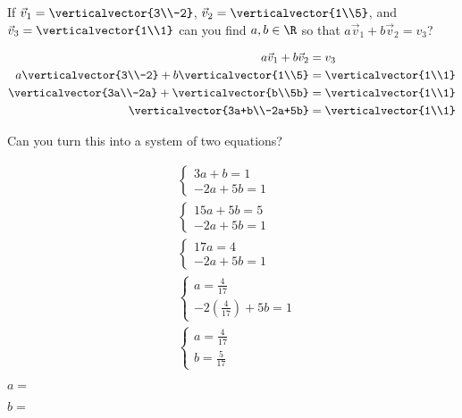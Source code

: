 \documentclass{ximera}
\begin{document}
\begin{question}
  
  If $\vec{v}_1 = \verticalvector{3\\-2} $, $\vec{v}_2 = \verticalvector{1\\5}$,  and  $\vec{v}_3 = \verticalvector{1\\1}$
  can you find $a,b \in \R$ so that $a\vec{v}_1+b\vec{v}_2=v_3$?
  \begin{solution}
    \begin{hint}
      \begin{align*}
        a\vec{v}_1+b\vec{v}_2&=v_3\\
        a\verticalvector{3\\-2} +b\verticalvector{1\\5} &=  \verticalvector{1\\1}\\
        \verticalvector{3a\\-2a}+\verticalvector{b\\5b} &= \verticalvector{1\\1}\\
        \verticalvector{3a+b\\-2a+5b} &= \verticalvector{1\\1}
      \end{align*}
      
      Can you turn this into a system of two equations?
    \end{hint}
    \begin{hint}	
      \begin{align*}
        &\begin{cases}
          3a+b=1\\
          -2a+5b=1
        \end{cases}\\
        &\begin{cases}
          15a+5b= 5\\
          -2a+5b=1
        \end{cases}\\
        &\begin{cases}
          17a = 4\\
          -2a+5b=1
        \end{cases}\\
        &\begin{cases}
          a = \frac{4}{17}\\
          -2(\frac{4}{17})+5b =1
        \end{cases}\\
        &\begin{cases}
          a = \frac{4}{17}\\
          b = \frac{5}{17}
        \end{cases}
      \end{align*}
    \end{hint}
    $a = $
  \end{solution}
  \begin{solution}
    $b=$ 
  \end{solution}
\end{question}
 	
\end{document}
